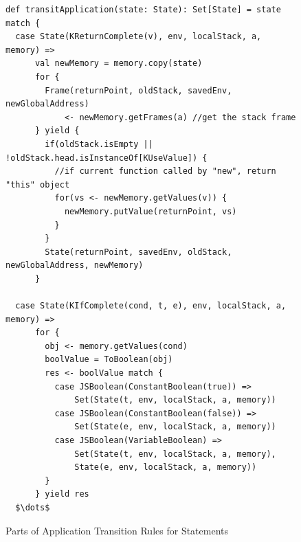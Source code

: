 \documentclass{article}
\begin{document}
\begin{figure}
\lstset{language=Scala, mathescape}
\begin{lstlisting}
def transitApplication(state: State): Set[State] = state match {
  case State(KReturnComplete(v), env, localStack, a, memory) =>
      val newMemory = memory.copy(state)
      for {
        Frame(returnPoint, oldStack, savedEnv, newGlobalAddress)
            <- newMemory.getFrames(a) //get the stack frame
      } yield {
        if(oldStack.isEmpty || !oldStack.head.isInstanceOf[KUseValue]) {
          //if current function called by "new", return "this" object
          for(vs <- newMemory.getValues(v)) {
            newMemory.putValue(returnPoint, vs)
          }
        }
        State(returnPoint, savedEnv, oldStack, newGlobalAddress, newMemory)
      }

  case State(KIfComplete(cond, t, e), env, localStack, a, memory) =>
      for {
        obj <- memory.getValues(cond)
        boolValue = ToBoolean(obj)
        res <- boolValue match {
          case JSBoolean(ConstantBoolean(true)) =>
              Set(State(t, env, localStack, a, memory))
          case JSBoolean(ConstantBoolean(false)) =>
              Set(State(e, env, localStack, a, memory))
          case JSBoolean(VariableBoolean) =>
              Set(State(t, env, localStack, a, memory),
              State(e, env, localStack, a, memory))
        }
      } yield res
  $\dots$

\end{lstlisting}
\caption{Parts of Application Transition Rules for Statements}
\label{fig:app-stmt}
\end{figure}
\end{document}
